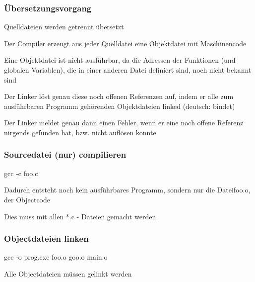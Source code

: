 			\subsubsection{Übersetzungsvorgang}	
				\begin{compactitem}
					\item Quelldateien werden getrennt übersetzt
					\item Der Compiler erzeugt aus jeder Quelldatei eine Objektdatei mit Maschinencode
					\item Eine Objektdatei ist nicht ausführbar, da die Adressen der Funktionen (und globalen Variablen), die in einer anderen Datei definiert sind, noch nicht bekannt sind
					\item Der Linker löst genau diese noch offenen Referenzen auf, indem er alle zum ausführbaren Programm gehörenden Objektdateien linked (deutsch: bindet)
					\item Der Linker meldet genau dann einen Fehler, wenn er eine noch offene Referenz nirgends gefunden hat, bzw. nicht auflösen konnte
				\end{compactitem}
			\begin{minipage}[t]{9 cm}
				\subsubsection{Sourcedatei (nur) compilieren}
					gcc -c foo.c\\
					\begin{compactitem}
						\item Dadurch entsteht noch kein ausführbares Programm, sondern nur die Dateifoo.o, der Objectcode
						\item Dies muss mit allen *.c - Dateien gemacht werden
					\end{compactitem}
			\end{minipage}
			\hspace*{0.5cm}
			\begin{minipage}[t]{9 cm}
				\subsubsection{Objectdateien linken}
					gcc  -o  prog.exe  foo.o  goo.o  main.o\\
					\begin{compactitem}
						\item Alle Objectdateien müssen gelinkt werden
					\end{compactitem}
			\end{minipage}\\\\
